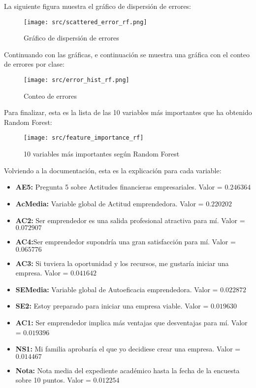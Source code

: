 La siguiente figura muestra el gráfico de dispersión de errores:\\
\linebreak
\begin{figure}[H]
	\centering
	\texttt{[image: src/scattered\_error\_rf.png]}
	\caption{Gráfico de dispersión de errores}
	\label{fig:rf_scattered}
\end{figure}
Continuando con las gráficas, e continuación se muestra una gráfica con el conteo de errores por clase:
\begin{figure}[H]
	\centering
	\texttt{[image: src/error\_hist\_rf.png]}
	\caption{Conteo de errores}
	\label{fig:rf_error_plot}
\end{figure}
Para finalizar, esta es la lista de las 10 variables más importantes que ha obtenido Random Forest:
\begin{figure}[H]
	\centering
	\texttt{[image: src/feature\_importance\_rf]}
	\caption{10 variables más importantes según Random Forest}
	\label{fig:feature_rf}
\end{figure}
Volviendo a la documentación, esta es la explicación para cada variable:
\begin{itemize}
	\item\textbf{AE5:} Pregunta 5 sobre Actitudes financieras empresariales. Valor = $0.246364$
	\item\textbf{AcMedia:} Variable global de Actitud emprendedora. Valor = $0.220202$
	\item\textbf{AC2:} Ser emprendedor es una salida profesional atractiva para mí. Valor = $0.072907$
	\item\textbf{AC4:}Ser emprendedor supondría una gran satisfacción para mí. Valor = $0.065776$
	\item\textbf{AC3:} Si tuviera la oportunidad y los recursos, me gustaría iniciar una empresa. Valor = $0.041642$
	\item\textbf{SEMedia:} Variable global de Autoeficacia emprendedora. Valor = $0.022872$
	\item\textbf{SE2:} Estoy preparado para iniciar una empresa viable. Valor = $0.019630$
	\item\textbf{AC1:} Ser emprendedor implica más ventajas que desventajas para mí. Valor = $0.019396$
	\item\textbf{NS1:} Mi familia aprobaría el que yo decidiese crear una empresa. Valor = $0.014467$
	\item\textbf{Nota:} Nota media del expediente académico hasta la fecha de la encuesta sobre 10 puntos. Valor = $0.012254$
\end{itemize}
